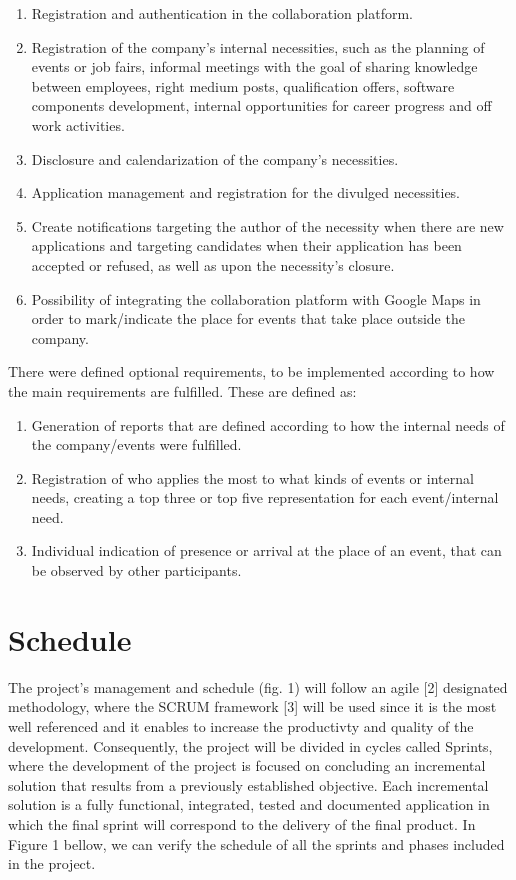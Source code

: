 \documentclass[a4paper,openright,12pt]{report}
\begin{document}
\begin{enumerate}
\item Registration and authentication in the collaboration platform.
\item Registration of the company's internal necessities, such as the planning of events or job fairs, informal meetings with the goal of sharing knowledge between employees, right medium posts, qualification offers, software components development, internal opportunities for career progress and off work activities.
\item Disclosure and calendarization of the company's necessities.
\item Application management and registration for the divulged necessities.
\item Create notifications targeting the author of the necessity when there are new applications and targeting candidates when their application has been accepted or refused, as well as upon the necessity's closure.
\item Possibility of integrating the collaboration platform with Google Maps in order to mark/indicate the place for events that take place outside the company.
\end{enumerate}

There were defined optional requirements, to be implemented according to how the main requirements are fulfilled. These are defined as:

\begin{enumerate}
\item Generation of reports that are defined according to how the internal needs of the company/events were fulfilled.
\item Registration of who applies the most to what kinds of events or internal needs, creating a top three or top five representation for each event/internal need. 
\item Individual indication of presence or arrival at the place of an event, that can be observed by other participants.
\end{enumerate}

\section*{Schedule} 

The project's management and schedule (fig. 1) will follow an agile [2] designated methodology, where the SCRUM framework [3] will be used since it is the most well referenced and it enables to increase the productivty and quality of the development. Consequently, the project will be divided in cycles called Sprints, where the development of the project is focused on concluding an incremental solution that results from a previously established objective. Each incremental solution  is a fully functional, integrated, tested and documented application in which the final sprint will correspond to the delivery of the final product. In Figure 1 bellow, we can verify the schedule of all the sprints and phases included in the project.
\end{document}

